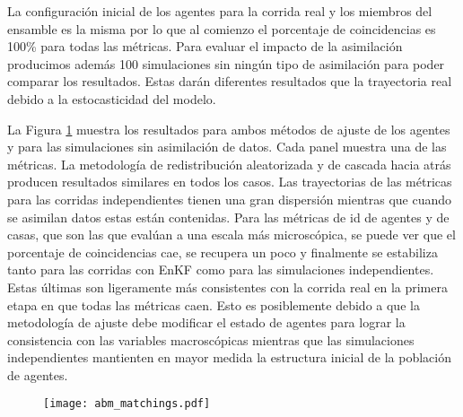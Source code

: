 La configuración inicial de los agentes para la corrida real y los miembros del ensamble es la misma por lo que al comienzo el porcentaje de coincidencias es 100\% para todas las métricas. Para evaluar el impacto de la asimilación  producimos además 100 simulaciones sin ningún tipo de asimilación para poder comparar los resultados. Estas darán diferentes resultados que la trayectoria real debido a la estocasticidad del modelo.

La Figura \ref{fig:abm_matchings} muestra los resultados para ambos métodos de ajuste de los agentes y para las simulaciones sin asimilación de datos. Cada panel muestra una de las métricas. La metodología de redistribución aleatorizada y de cascada hacia atrás producen resultados similares en todos los casos. Las trayectorias de las métricas para las corridas independientes tienen una gran dispersión mientras que cuando se asimilan datos estas están contenidas. Para las métricas de id de agentes y de casas, que son las que evalúan a una escala más microscópica, se puede ver que el porcentaje de coincidencias cae, se recupera un poco y finalmente se estabiliza tanto para las corridas con EnKF como para las simulaciones independientes. Estas últimas son ligeramente más consistentes con la corrida real en la primera etapa en que todas las métricas caen. Esto es posiblemente debido a que la metodología de ajuste debe modificar el estado de agentes para lograr la consistencia con las variables macroscópicas mientras que las simulaciones independientes mantienten en mayor medida la estructura inicial de la población de agentes.
\begin{figure}[h!]
    \centering
    \texttt{[image: abm\_matchings.pdf]}
    \caption{}
    \label{fig:abm_matchings}
\end{figure}

